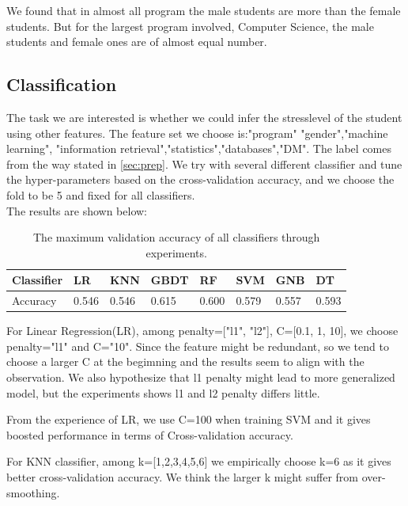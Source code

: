 \documentclass[runningheads]{llncs}
\begin{document}
We found that in almost all program the male students are more than the female students. But for the largest program involved, Computer Science, the male students and female ones are of almost equal number.


\subsection{Classification}
The task we are interested is whether we could infer the stresslevel of the student using other features. The feature set we choose is:"program" "gender","machine learning", "information retrieval","statistics","databases","DM". The label comes from the way stated in \ref{sec:prep}. We try with several different classifier and tune the hyper-parameters based on the cross-validation accuracy, and we choose the fold to be 5 and fixed for all classifiers.\\ The results are shown below:
\begin{table}[]
    \centering
    \caption{The maximum validation accuracy of all classifiers through experiments.}
    \begin{tabular}{|l|l|l|l|l|l|l|l|}
        \hline
        Classifier & LR    & KNN   & GBDT  & RF    & SVM   & GNB   & DT    \\ \hline
        Accuracy & 0.546 & 0.546 & 0.615 & 0.600 & 0.579 & 0.557 & 0.593 \\ \hline
    \end{tabular}
    \label{fig:gender}
\end{table}
For Linear Regression(LR), among penalty=["l1", "l2"], C=[0.1, 1, 10], we choose penalty="l1" and C="10". Since the feature might be redundant, so we tend to choose a larger C at the begimning and the results seem to align with the observation. We also hypothesize that l1 penalty might lead to more generalized model, but the experiments shows l1 and l2 penalty differs little.

From the experience of LR, we use C=100 when training SVM and it gives boosted performance in terms of Cross-validation accuracy.

For KNN classifier, among k=[1,2,3,4,5,6] we empirically choose k=6 as it gives better cross-validation accuracy. We think the larger k might suffer from over-smoothing.
\end{document}
